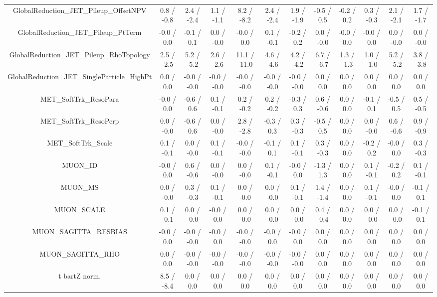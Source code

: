 \begin{table}[htbp]
\begin{center}
\begin{tabular}{|c|c|c|c|c|c|c|c|c|c|c|c|}
  GlobalReduction_JET_Pileup_OffsetNPV & 0.8 / -0.8 & 2.4 / -2.4 & 1.1 / -1.1 & 8.2 / -8.2 & 2.4 / -2.4 & 1.9 / -1.9 & -0.5 / 0.5 & -0.2 / 0.2 & 0.3 / -0.3 & 2.1 / -2.1 & 1.7 / -1.7 \\ 
  GlobalReduction_JET_Pileup_PtTerm & -0.0 / 0.0 & -0.1 / 0.1 & 0.0 / -0.0 & -0.0 / 0.0 & 0.1 / -0.1 & -0.2 / 0.2 & 0.0 / -0.0 & -0.0 / 0.0 & -0.0 / 0.0 & 0.0 / -0.0 & 0.0 / -0.0 \\ 
  GlobalReduction_JET_Pileup_RhoTopology & 2.5 / -2.5 & 5.2 / -5.2 & 2.6 / -2.6 & 11.1 / -11.0 & 4.6 / -4.6 & 4.2 / -4.2 & 6.7 / -6.7 & 1.3 / -1.3 & 1.0 / -1.0 & 5.2 / -5.2 & 3.8 / -3.8 \\ 
  GlobalReduction_JET_SingleParticle_HighPt & 0.0 / 0.0 & -0.0 / -0.0 & -0.0 / -0.0 & -0.0 / -0.0 & -0.0 / -0.0 & -0.0 / -0.0 & 0.0 / 0.0 & 0.0 / 0.0 & 0.0 / 0.0 & 0.0 / 0.0 & 0.0 / 0.0 \\ 
  MET_SoftTrk_ResoPara & -0.0 / 0.0 & -0.6 / 0.6 & 0.1 / -0.1 & 0.2 / -0.2 & 0.2 / -0.2 & -0.3 / 0.3 & 0.6 / -0.6 & 0.0 / 0.0 & -0.1 / 0.1 & -0.5 / 0.5 & 0.5 / -0.5 \\ 
  MET_SoftTrk_ResoPerp & 0.0 / -0.0 & -0.6 / 0.6 & 0.0 / -0.0 & 2.8 / -2.8 & -0.3 / 0.3 & 0.3 / -0.3 & -0.5 / 0.5 & 0.0 / 0.0 & 0.0 / -0.0 & 0.6 / -0.6 & 0.9 / -0.9 \\ 
  MET_SoftTrk_Scale & 0.1 / -0.1 & 0.0 / -0.0 & 0.1 / -0.1 & -0.0 / -0.0 & -0.1 / 0.1 & 0.1 / -0.1 & 0.3 / -0.3 & 0.0 / 0.0 & -0.2 / 0.2 & -0.0 / 0.0 & 0.3 / -0.3 \\ 
  MUON_ID & -0.0 / 0.0 & 0.6 / -0.6 & 0.0 / -0.0 & 0.0 / -0.0 & 0.1 / -0.1 & -0.0 / 0.0 & -1.3 / 1.3 & 0.0 / 0.0 & 0.1 / -0.1 & -0.2 / 0.2 & 0.1 / -0.1 \\ 
  MUON_MS & 0.0 / -0.0 & 0.3 / -0.3 & 0.1 / -0.1 & 0.0 / -0.0 & 0.0 / -0.0 & 0.1 / -0.1 & 1.4 / -1.4 & 0.0 / 0.0 & 0.1 / -0.1 & -0.0 / 0.0 & -0.1 / 0.1 \\ 
  MUON_SCALE & 0.1 / -0.1 & 0.0 / -0.0 & -0.0 / 0.0 & 0.0 / -0.0 & 0.0 / -0.0 & 0.0 / -0.0 & 0.4 / -0.4 & 0.0 / 0.0 & 0.0 / -0.0 & 0.0 / -0.0 & -0.1 / 0.1 \\ 
  MUON_SAGITTA_RESBIAS & -0.0 / 0.0 & -0.0 / -0.0 & -0.0 / 0.0 & -0.0 / -0.0 & -0.0 / 0.0 & -0.0 / 0.0 & 0.0 / 0.0 & 0.0 / 0.0 & 0.0 / 0.0 & 0.0 / 0.0 & 0.0 / 0.0 \\ 
  MUON_SAGITTA_RHO & 0.0 / 0.0 & -0.0 / -0.0 & -0.0 / -0.0 & -0.0 / -0.0 & -0.0 / -0.0 & -0.0 / -0.0 & 0.0 / 0.0 & 0.0 / 0.0 & 0.0 / 0.0 & 0.0 / 0.0 & 0.0 / 0.0 \\ 
  t bar{t}Z norm. & 8.5 / -8.4 & 0.0 / 0.0 & 0.0 / 0.0 & 0.0 / 0.0 & 0.0 / 0.0 & 0.0 / 0.0 & 0.0 / 0.0 & 0.0 / 0.0 & 0.0 / 0.0 & 0.0 / 0.0 & 0.0 / 0.0 \\ 

\end{tabular}
\end{center}
\end{table}
